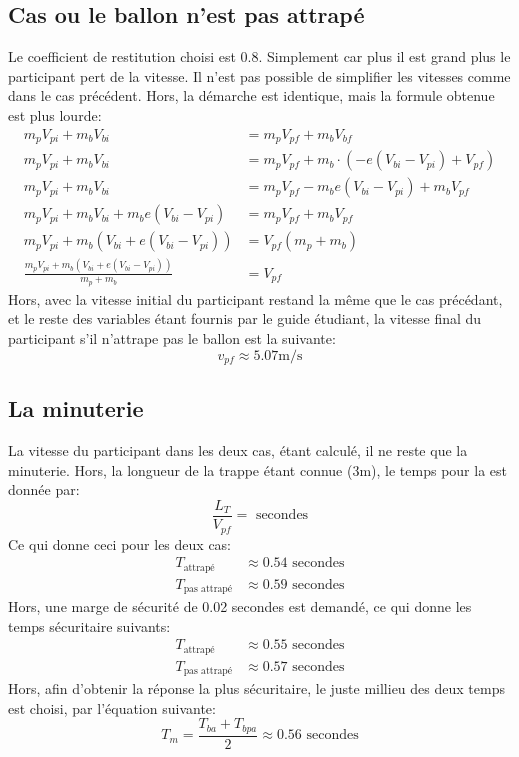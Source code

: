 \subsection{Cas ou le ballon n'est pas attrapé}
Le coefficient de restitution choisi est 0.8. Simplement car plus il est grand
plus le participant pert de la vitesse. Il n'est pas possible de simplifier
les vitesses comme dans le cas précédent. Hors, la démarche est identique,
mais la formule obtenue est plus lourde:
\begin{align}
m_p V_{pi}+m_b V_{bi}&=m_p V_{pf}+m_b V_{bf} \\
m_p V_{pi}+m_b V_{bi}&=m_p V_{pf}+m_b \cdot(-e(V_{bi}-V_{pi})+V_{pf}) \\
m_p V_{pi}+m_b V_{bi}&=m_p V_{pf}-m_b e(V_{bi}-V_{pi})+m_bV_{pf} \\
m_p V_{pi}+m_b V_{bi}+m_be(V_{bi}-V_{pi})&=m_pV_{pf}+m_bV_{pf} \\
m_p V_{pi}+m_b(V_{bi}+e(V_{bi}-V_{pi}))&=V_{pf}(m_p+m_b) \\
\frac{m_pV_{pi}+m_b(V_{bi}+e(V_{bi}-V_{pi}))}{m_p+m_b}&=V_{pf}
\end{align}
Hors, avec la vitesse initial du participant restand la même que le cas
précédant, et le reste des variables étant fournis par le guide étudiant, la
vitesse final du participant s'il n'attrape pas le ballon est la suivante:
\begin{equation}
v_{pf}\approx5.07\text{m/s}
\end{equation}

\subsection{La minuterie}
La vitesse du participant dans les deux cas, étant calculé, il ne reste que la
minuterie. Hors, la longueur de la trappe étant connue (3m), le temps pour la
est donnée par:
\begin{equation}
\frac{L_T}{V_{pf}}=\text{ secondes}
\end{equation}
Ce qui donne ceci pour les deux cas:
\begin{align}
	T_{\text{attrapé}}&\approx0.54\text{ secondes}\\
	T_{\text{pas attrapé}}&\approx0.59\text{ secondes}
\end{align}
Hors, une marge de sécurité de 0.02 secondes est demandé, ce qui donne les
temps sécuritaire suivants:
\begin{align}
	T_{\text{attrapé}}&\approx0.55\text{ secondes}\\
	T_{\text{pas attrapé}}&\approx0.57\text{ secondes}
\end{align}
Hors, afin d'obtenir la réponse la plus sécuritaire, le juste millieu des
deux temps est choisi, par l'équation suivante:
\begin{equation}
T_m = \frac{T_{ba}+T_{bpa}}{2}\approx0.56\text{ secondes}
\end{equation}
